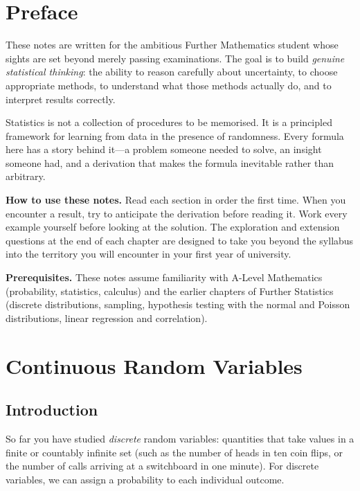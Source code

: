 \documentclass[12pt, a4paper, oneside]{book}
\theoremstyle{definition}
\theoremstyle{plain}
\theoremstyle{remark}
\begin{document}
\chapter*{Preface}

These notes are written for the ambitious Further Mathematics student whose
sights are set beyond merely passing examinations.  The goal is to build
\emph{genuine statistical thinking}: the ability to reason carefully about
uncertainty, to choose appropriate methods, to understand what those methods
actually do, and to interpret results correctly.

Statistics is not a collection of procedures to be memorised.  It is a
principled framework for learning from data in the presence of randomness.
Every formula here has a story behind it---a problem someone needed to solve,
an insight someone had, and a derivation that makes the formula inevitable
rather than arbitrary.

\medskip
\textbf{How to use these notes.}\quad
Read each section in order the first time.  When you encounter a result,
try to anticipate the derivation before reading it.  Work every example
yourself before looking at the solution.  The exploration and extension
questions at the end of each chapter are designed to take you beyond the
syllabus into the territory you will encounter in your first year of
university.

\medskip
\textbf{Prerequisites.}\quad
These notes assume familiarity with A-Level Mathematics (probability,
statistics, calculus) and the earlier chapters of Further Statistics
(discrete distributions, sampling, hypothesis testing with the normal
and Poisson distributions, linear regression and correlation).

\tableofcontents

\chapter{Continuous Random Variables}
\label{ch:crv}

\section{Introduction}

So far you have studied \emph{discrete} random variables: quantities that
take values in a finite or countably infinite set (such as the number of
heads in ten coin flips, or the number of calls arriving at a switchboard
in one minute).  For discrete variables, we can assign a probability to
each individual outcome.
\end{document}
